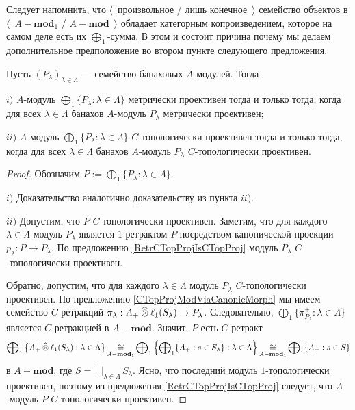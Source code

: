 Следует напомнить, что $\langle$~произвольное / лишь конечное~$\rangle$ семейство объектов в $\langle$~$A-\mathbf{mod}_1$ / $A-\mathbf{mod}$~$\rangle$ обладает категорным копроизведением, которое на самом деле есть их $\bigoplus_1$-сумма. В этом и состоит причина почему мы делаем дополнительное предположение во втором пункте следующего предложения.

\begin{proposition}\label{MetTopProjModCoprod} Пусть $(P_\lambda)_{\lambda\in\Lambda}$ --- семейство банаховых $A$-модулей. Тогда 

$i)$ $A$-модуль $\bigoplus_1\{P_\lambda:\lambda\in\Lambda\}$ метрически проективен тогда и только тогда, когда для всех $\lambda\in\Lambda$ банахов $A$-модуль $P_\lambda$ метрически проективен;

$ii)$ $A$-модуль $\bigoplus_1\{P_\lambda:\lambda\in\Lambda\}$ $C$-топологически проективен тогда и только тогда, когда для всех $\lambda\in\Lambda$ банахов $A$-модуль $P_\lambda$ $C$-топологически проективен.
\end{proposition}
\begin{proof} Обозначим $P:=\bigoplus_1\{P_\lambda:\lambda\in\Lambda\}$.

$i)$ Доказательство аналогично доказательству из пункта $ii)$.

$ii)$ Допустим, что $P$ $C$-топологически проективен. Заметим, что для каждого $\lambda\in\Lambda$ модуль $P_\lambda$ является $1$-ретрактом $P$ посредством канонической проекции $p_\lambda:P\to P_\lambda$. По предложению \ref{RetrCTopProjIsCTopProj} модуль $P_\lambda$ $C$-топологически проективен.

Обратно, допустим, что для каждого $\lambda\in\Lambda$ модуль $P_\lambda$ $C$-топологически проективен. По предложению \ref{CTopProjModViaCanonicMorph} мы имеем семейство $C$-ретракций $\pi_\lambda:A_+\mathbin{\widehat{\otimes}}\ell_1(S_\lambda)\to P_\lambda$. Следовательно, $\bigoplus_1\{\pi_{P_\lambda}^+:\lambda\in\Lambda\}$ является $C$-ретракцией в $A-\mathbf{mod}$. Значит, $P$ есть $C$-ретракт 
$$
\bigoplus\nolimits_1\left\{A_+\mathbin{\widehat{\otimes}} \ell_1(S_\lambda):\lambda\in\Lambda\right\}
\mathop{\mathbin{\cong}}\limits_{A-\mathbf{mod}_1}
\bigoplus\nolimits_1\left\{\bigoplus\nolimits_1\{A_+:s\in S_\lambda\}:\lambda\in\Lambda\right\}
\mathop{\mathbin{\cong}}\limits_{A-\mathbf{mod}_1}
\bigoplus\nolimits_1\{A_+:s\in S\}
$$
в $A-\mathbf{mod}$, где $S=\bigsqcup_{\lambda\in\Lambda}S_\lambda$. Ясно, что последний модуль $1$-топологически проективен, поэтому из предложения \ref{RetrCTopProjIsCTopProj} следует, что $A$-модуль $P$ $C$-топологически проективен.
\end{proof}

